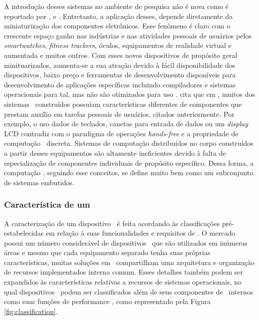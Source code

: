 	A introdução desses sistemas no ambiente de pesquisa não é nova como é reportado por \cite{Sutherland1968}, \cite{Mann1996} e \cite{Mann1997}. Entretanto, a aplicação desses, depende diretamente da miniaturização dos componentes eletrônicos. Esse fenômeno é claro com o crescente espaço ganho nas indústrias e nas atividades pessoais de usuários pelos \textit{smartwatches}, \textit{fitness trackers}, óculos, equipamentos de realidade virtual e aumentada e muitos outros. Com esses novos dispositivos de propósito geral minituarizados, aumenta-se a sua atração devido à fácil disponibilidade dos dispositivos, baixo preço e ferramentas de desenvolvimento disponíveis para desenvolvimento de aplicações específicas incluindo compiladores e sistemas operacionais para tal, mas não são otimizados para uso \wearable.
	\cite{Plessl2003} cita que em \cite{Plessl2003}, muitos dos sistemas \wearables\ construídos possuíam características diferentes de componentes que prestam auxílio em tarefas pessoais de usuários, citados anteriormente.
	Por exemplo, o uso dados de teclados, canetas para entrada de dados ou um \textit{display} LCD contradiz com o paradigma de operações \textit{hands-free} e a propriedade de computação \wearable\ discreta.
	Sistemas de computação distribuídos no corpo construídos a partir desses equipamentos são altamente ineficientes devido à falta de especialização de componentes individuais de propósito específico.
	Dessa forma, a computação \wearable, seguindo esse conceitos, se define muito bem como um subconjunto de sistemas embutidos.

	\subsubsection{Característica de um \Wearable}

		A caracterização de um dispositivo \wearable\ é feita acordando às classificações pré-estabelecidas em relação à suas funcionalidades e requisitos de \hardware. O mercado possui um número considerável de dispositivos \wearables\ que são utilizados em inúmeras áreas e mesmo que cada equipamento separado tenha suas próprias características, muitas soluções em \hardware\ compartilham uma arquitetura e organização de recursos implementados interna comum.
		Esses detalhes também podem ser expandidos às características relativas a recursos de sistemas operacionais, no qual dispositivos \wearables\ podem ser classificados além de seus componentes de \hardware\ internos como suas funções de performance \cite{Delabrida2016, Amorim2017}, como representado pela Figura \ref{fig:classification}.

